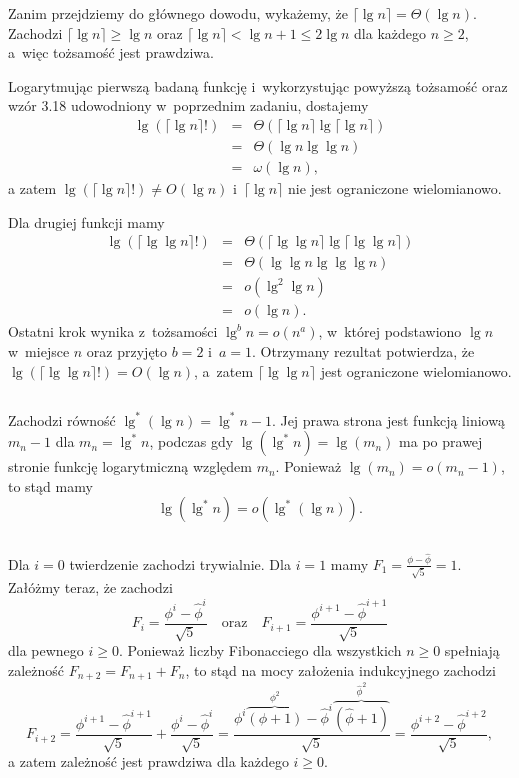 Zanim przejdziemy do głównego dowodu, wykażemy, że $\lceil\lg n\rceil=\Theta(\lg n)$. Zachodzi $\lceil\lg n\rceil\ge\lg n$ oraz $\lceil\lg n\rceil<\lg n+1\le 2\lg n$ dla każdego $n\ge 2$, a~więc tożsamość jest prawdziwa.

Logarytmując pierwszą badaną funkcję i~wykorzystując powyższą tożsamość oraz wzór 3.18 udowodniony w~poprzednim zadaniu, dostajemy
\begin{eqnarray*}
	\lg\left(\lceil\lg n\rceil!\right) &=& \Theta\left(\lceil\lg n\rceil\lg\lceil\lg n\rceil\right) \\
	&=& \Theta(\lg n\lg\lg n) \\
	&=& \omega(\lg n),
\end{eqnarray*}
a zatem $\lg\left(\lceil\lg n\rceil!\right)\ne O(\lg n)$ i~$\lceil\lg n\rceil$ nie jest ograniczone wielomianowo.

Dla drugiej funkcji mamy
\begin{eqnarray*}
	\lg\left(\lceil\lg\lg n\rceil!\right) &=& \Theta\left(\lceil\lg\lg n\rceil\lg\lceil\lg\lg n\rceil\right) \\
	&=& \Theta(\lg\lg n\lg\lg\lg n) \\
	&=& o\left(\lg^2\lg n\right) \\
	&=& o(\lg n).
\end{eqnarray*}
Ostatni krok wynika z~tożsamości $\lg^bn=o(n^a)$, w~której podstawiono $\lg n$ w~miejsce $n$ oraz przyjęto $b=2$ i~$a=1$. Otrzymany rezultat potwierdza, że $\lg\left(\lceil\lg\lg n\rceil!\right)=O(\lg n)$, a~zatem $\lceil\lg\lg n\rceil$ jest ograniczone wielomianowo.

\subsection{} %
Zachodzi równość $\lg^*(\lg n) = \lg^*n-1$. Jej prawa strona jest funkcją liniową $m_n-1$ dla $m_n = \lg^*n$, podczas gdy $\lg(\lg^*n) = \lg(m_n)$ ma po prawej stronie funkcję logarytmiczną względem $m_n$. Ponieważ $\lg(m_n)=o(m_n-1)$, to stąd mamy
\[
	\lg(\lg^*n) = o(\lg^*(\lg n)).
\]

\subsection{} %
Dla $i=0$ twierdzenie zachodzi trywialnie. Dla $i=1$ mamy $F_1=\frac{\phi-\widehat\phi}{\sqrt{5}}=1$. Załóżmy teraz, że zachodzi
\[
	F_i=\frac{\phi^i-\widehat\phi^i}{\sqrt{5}}\quad\mbox{oraz}\quad F_{i+1}=\frac{\phi^{i+1}-\widehat\phi^{i+1}}{\sqrt{5}}
\]
dla pewnego $i\ge 0$. Ponieważ liczby Fibonacciego dla wszystkich $n\ge 0$ spełniają zależność $F_{n+2}=F_{n+1}+F_n$, to stąd na mocy założenia indukcyjnego zachodzi
\[
	F_{i+2} = \frac{\phi^{i+1}-\widehat\phi^{i+1}}{\sqrt{5}}+\frac{\phi^i-\widehat\phi^i}{\sqrt{5}} = \frac{\phi^i\overbrace{(\phi+1)}^{\phi^2}-\widehat\phi^i\overbrace{\left(\widehat\phi+1\right)}^{\widehat\phi^2}}{\sqrt{5}} = \frac{\phi^{i+2}-\widehat\phi^{i+2}}{\sqrt{5}},
\]
a zatem zależność jest prawdziwa dla każdego $i\ge 0$.

